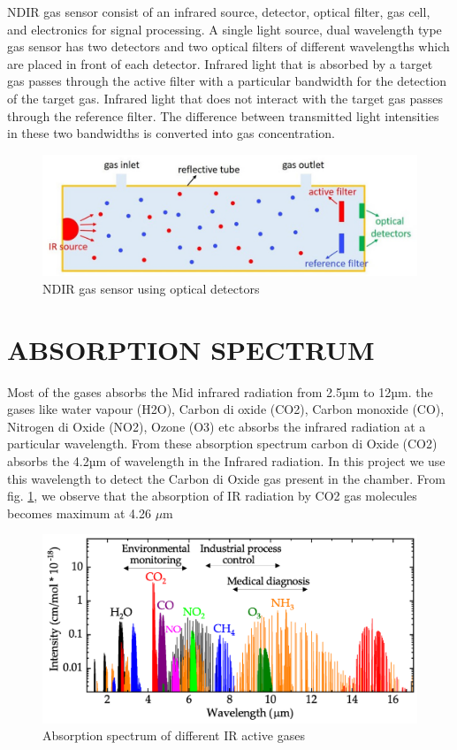 \documentclass[12pt]{article}
\begin{document}
NDIR gas sensor consist of an infrared source, detector, optical filter, gas cell, and electronics for signal processing. A single light source, dual wavelength type gas sensor has two detectors and two optical filters of different wavelengths which are placed in front of each detector. Infrared light that is absorbed by a target gas passes through the active filter with a particular bandwidth for the detection of the target gas. Infrared light that does not interact with the target gas passes through the reference filter. The difference between transmitted light intensities in these two bandwidths is converted into gas concentration.

\begin{figure}[h]
\centering
\includegraphics[scale=0.7]{NDIR1.jpg}
\caption{NDIR gas sensor using optical detectors}
\end{figure}

\section{ABSORPTION SPECTRUM}
Most of the gases absorbs the Mid infrared radiation from 2.5µm to 12µm. the gases like water vapour (H2O), Carbon di oxide (CO2), Carbon monoxide (CO), Nitrogen di Oxide (NO2), Ozone (O3) etc absorbs the infrared radiation at a particular wavelength. From these absorption spectrum carbon di Oxide (CO2) absorbs the 4.2µm of wavelength in the Infrared radiation. In this project we use this wavelength to detect the Carbon di Oxide gas present in the chamber. From fig. \ref{Absorption spectrum of different IR active gases}, we observe that the absorption of IR radiation by CO2 gas molecules becomes maximum at 4.26 $\mu$m 

\begin{figure}[h]
\centering
\includegraphics[scale=0.55]{absorption spectrum.png}
\caption{Absorption spectrum of different IR active gases}
\label{Absorption spectrum of different IR active gases}
\end{figure}
\end{document}
